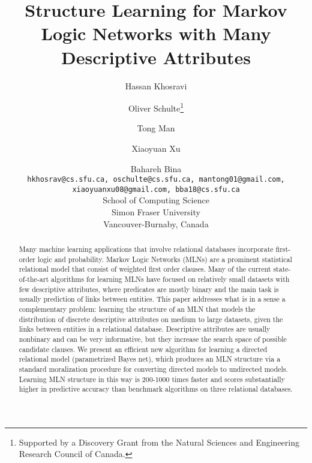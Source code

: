 \documentclass[letterpaper]{article}
\begin{document}
\date{}
\title{Structure Learning for Markov Logic Networks with Many Descriptive Attributes}
\author{Hassan Khosravi \and Oliver Schulte\thanks{Supported by a Discovery Grant from the Natural Sciences and Engineering Research Council of Canada.} \and Tong Man \and Xiaoyuan Xu  \and Bahareh Bina  \\ \texttt{hkhosrav@cs.sfu.ca, oschulte@cs.sfu.ca, mantong01@gmail.com,} \\ \texttt{xiaoyuanxu08@gmail.com, bba18@cs.sfu.ca} \\ School of Computing Science\\ Simon Fraser University\\Vancouver-Burnaby, Canada} 
\maketitle
\begin{abstract}
Many machine learning applications that involve relational databases incorporate first-order logic and probability. Markov Logic Networks (MLNs) are a prominent statistical relational model that consist of weighted first order clauses. Many of the current state-of-the-art algorithms for learning MLNs 
have focused on relatively small datasets with few descriptive attributes, where predicates are mostly binary and the main task is usually prediction of links between entities.
This paper addresses what is in a sense a complementary problem: learning the structure of an MLN that models the distribution of discrete descriptive attributes on medium to large datasets, given the links between entities in a relational database. 
Descriptive attributes are usually nonbinary and can be very informative, but they increase the search space of possible candidate clauses. 
We present an efficient new algorithm for learning a directed relational model (parametrized Bayes net), which produces an MLN structure via a standard moralization procedure for converting directed models to undirected models. 
Learning MLN structure in this way is 200-1000 times faster and scores substantially higher in predictive accuracy than benchmark algorithms
on three relational databases. 
\end{abstract}
\end{document}
